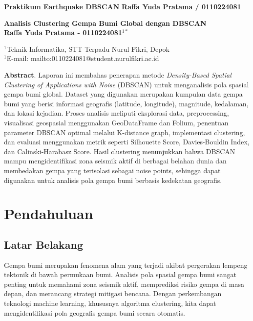 \documentclass[12pt,a4paper]{article}
\begin{document}
\noindent
\textbf{Praktikum Earthquake DBSCAN} \hfill \textbf{Raffa Yuda Pratama / 0110224081}

\vspace{1em}

\begin{center}
\textbf{\large Analisis Clustering Gempa Bumi Global dengan DBSCAN} \\
\textbf{\large Raffa Yuda Pratama - 0110224081$^{1*}$}
\end{center}

\noindent
$^1$Teknik Informatika, STT Terpadu Nurul Fikri, Depok \\
$^1$E-mail: mailto:0110224081@student.nurulfikri.ac.id

\vspace{1em}

\noindent
\textbf{Abstract}. Laporan ini membahas penerapan metode \textit{Density-Based Spatial Clustering of Applications with Noise} (DBSCAN) untuk menganalisis pola spasial gempa bumi global. Dataset yang digunakan merupakan kumpulan data gempa bumi yang berisi informasi geografis (latitude, longitude), magnitude, kedalaman, dan lokasi kejadian. Proses analisis meliputi eksplorasi data, preprocessing, visualisasi geospasial menggunakan GeoDataFrame dan Folium, penentuan parameter DBSCAN optimal melalui K-distance graph, implementasi clustering, dan evaluasi menggunakan metrik seperti Silhouette Score, Davies-Bouldin Index, dan Calinski-Harabasz Score. Hasil clustering menunjukkan bahwa DBSCAN mampu mengidentifikasi zona seismik aktif di berbagai belahan dunia dan membedakan gempa yang terisolasi sebagai noise points, sehingga dapat digunakan untuk analisis pola gempa bumi berbasis kedekatan geografis.

\vspace{1em}

\section{Pendahuluan}

\subsection{Latar Belakang}
Gempa bumi merupakan fenomena alam yang terjadi akibat pergerakan lempeng tektonik di bawah permukaan bumi. Analisis pola spasial gempa bumi sangat penting untuk memahami zona seismik aktif, memprediksi risiko gempa di masa depan, dan merancang strategi mitigasi bencana. Dengan perkembangan teknologi machine learning, khususnya algoritma clustering, kita dapat mengidentifikasi pola geografis gempa bumi secara otomatis.
\end{document}
